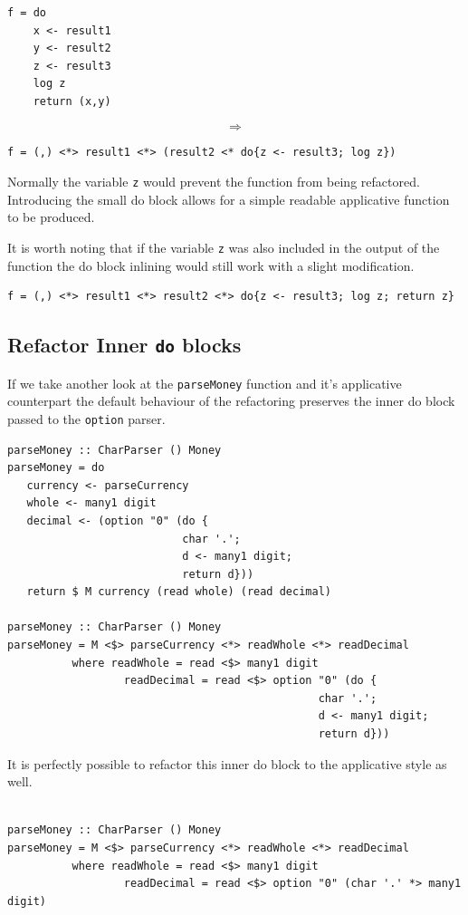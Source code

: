 \begin{lstlisting}[frame=tblr]
f = do
	x <- result1
	y <- result2
	z <- result3
	log z
	return (x,y)
\end{lstlisting}
\larger[5]
\[\Rightarrow\]
\normalsize
\begin{lstlisting}[frame=tblr]
f = (,) <*> result1 <*> (result2 <* do{z <- result3; log z})
\end{lstlisting}

Normally the variable \texttt{z} would prevent the function from being refactored. Introducing the small do block allows for a simple readable applicative function to be produced. 

It is worth noting that if the variable \texttt{z} was also included in the output of the function the do block inlining would still work with a slight modification.

\begin{lstlisting}[frame=tblr]
f = (,) <*> result1 <*> result2 <*> do{z <- result3; log z; return z}
\end{lstlisting}

\subsection{Refactor Inner \texttt{do} blocks}
If we take another look at the \texttt{parseMoney} function and it's applicative counterpart the default behaviour of the refactoring preserves the inner do block passed to the \texttt{option} parser.

\begin{lstlisting}[frame=tlrb]
parseMoney :: CharParser () Money
parseMoney = do
   currency <- parseCurrency 
   whole <- many1 digit
   decimal <- (option "0" (do { 
                           char '.';
                           d <- many1 digit;
                           return d}))
   return $ M currency (read whole) (read decimal)
   
parseMoney :: CharParser () Money
parseMoney = M <$> parseCurrency <*> readWhole <*> readDecimal
          where readWhole = read <$> many1 digit
                  readDecimal = read <$> option "0" (do { 
                           						char '.';
                          						d <- many1 digit;
                           						return d}))
\end{lstlisting}

It is perfectly possible to refactor this inner do block to the applicative style as well.

\begin{lstlisting}[frame=tblr]

parseMoney :: CharParser () Money
parseMoney = M <$> parseCurrency <*> readWhole <*> readDecimal
          where readWhole = read <$> many1 digit
                  readDecimal = read <$> option "0" (char '.' *> many1 digit)
\end{lstlisting}


